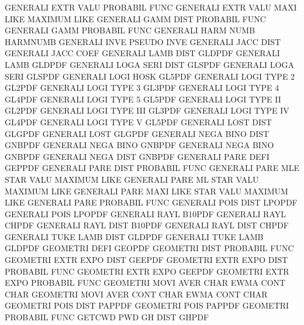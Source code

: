 GENERALI EXTR VALU                      PROBABIL FUNC
GENERALI EXTR VALU MAXI LIKE            MAXIMUM  LIKE
GENERALI GAMM DIST                      PROBABIL FUNC
GENERALI GAMM                           PROBABIL FUNC
GENERALI HARM NUMB                      HARMNUMB
GENERALI INVE                           PSEUDO   INVE
GENERALI JACC DIST                      GENERALI JACC COEF
GENERALI LAMB DIST                      GLDPDF
GENERALI LAMB                           GLDPDF
GENERALI LOGA SERI DIST                 GLSPDF
GENERALI LOGA SERI                      GLSPDF
GENERALI LOGI HOSK                      GL5PDF
GENERALI LOGI TYPE 2                    GL2PDF
GENERALI LOGI TYPE 3                    GL3PDF
GENERALI LOGI TYPE 4                    GL4PDF
GENERALI LOGI TYPE 5                    GL5PDF
GENERALI LOGI TYPE II                   GL2PDF
GENERALI LOGI TYPE III                  GL3PDF
GENERALI LOGI TYPE IV                   GL4PDF
GENERALI LOGI TYPE V                    GL5PDF
GENERALI LOST DIST                      GLGPDF
GENERALI LOST                           GLGPDF
GENERALI NEGA BINO DIST                 GNBPDF
GENERALI NEGA BINO                      GNBPDF
GENERALI NEGA BINO                      GNBPDF
GENERALI NEGA DIST                      GNBPDF
GENERALI PARE DEFI                      GEPPDF
GENERALI PARE DIST                      PROBABIL FUNC
GENERALI PARE MLE  STAR VALU            MAXIMUM  LIKE
GENERALI PARE ML   STAR VALU            MAXIMUM  LIKE
GENERALI PARE MAXI LIKE STAR VALU       MAXIMUM  LIKE
GENERALI PARE                           PROBABIL FUNC
GENERALI POIS DIST                      LPOPDF
GENERALI POIS                           LPOPDF
GENERALI RAYL                           B10PDF
GENERALI RAYL                           CHPDF
GENERALI RAYL DIST                      B10PDF
GENERALI RAYL DIST                      CHPDF
GENERALI TUKE LAMB DIST                 GLDPDF
GENERALI TUKE LAMB                      GLDPDF
GEOMETRI DEFI                           GEOPDF
GEOMETRI DIST                           PROBABIL FUNC
GEOMETRI EXTR EXPO DIST                 GEEPDF
GEOMETRI EXTR EXPO DIST                 PROBABIL FUNC
GEOMETRI EXTR EXPO                      GEEPDF
GEOMETRI EXTR EXPO                      PROBABIL FUNC
GEOMETRI MOVI AVER CHAR                 EWMA     CONT CHAR
GEOMETRI MOVI AVER CONT CHAR            EWMA     CONT CHAR
GEOMETRI POIS DIST                      PAPPDF
GEOMETRI POIS                           PAPPDF
GEOMETRI                                PROBABIL FUNC
GETCWD                                  PWD
GH       DIST                           GHPDF
